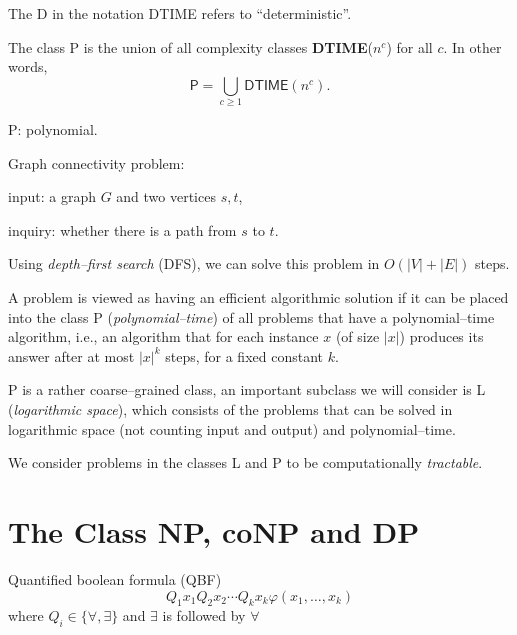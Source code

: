 The \textsf{D} in the notation \textsf{DTIME} refers to ``deterministic''.



\begin{df}
    The class \textsf{P} is the union of all complexity classes \textbf{DTIME}($n^c$) for all  $c$.
    In other words,
    \[
        \mathsf{P} = \bigcup_{c \geq 1} \mathsf{DTIME}(n^c).
    \]
\end{df}


P: polynomial.



\begin{example}
    Graph connectivity problem: 
    
    input: a graph $G$ and two vertices $s,t$, 
    
    inquiry: whether there is a path from $s$ to $t$.

    Using \textit{depth--first search} (DFS), 
    we can solve this problem in $O(|V|+|E|)$ steps.
\end{example}


\dotfill

\vspace{1.5em}

A problem is viewed as having an efficient algorithmic solution if it can be placed into the class \textsf{P} (\textit{polynomial--time}) of all problems that have a polynomial--time algorithm, 
i.e., 
an algorithm that for each instance $x$ (of size $|x|$) produces its answer after at most $|x|^k$ steps, for a fixed constant $k$.


\textsf{P} is a rather coarse--grained class, 
an important subclass we will consider is \textsf{L} (\textit{logarithmic space}), 
which consists of the problems that can be solved in logarithmic space (not counting input and output) and polynomial--time.


We consider problems in the classes \textsf{L} and \textsf{P} to be computationally \textit{tractable}.




\section{The Class \textsf{NP}, \textsf{coNP} and \textsf{DP}}



\dotfill


Quantified boolean formula (QBF) 
\[
    Q_1 x_1 Q_2 x_2 \cdots Q_k x_k \varphi (x_1,\dots,x_k)
\]
where $Q_i \in \{\forall, \exists\}$ and $\exists$ is followed by $\forall$




